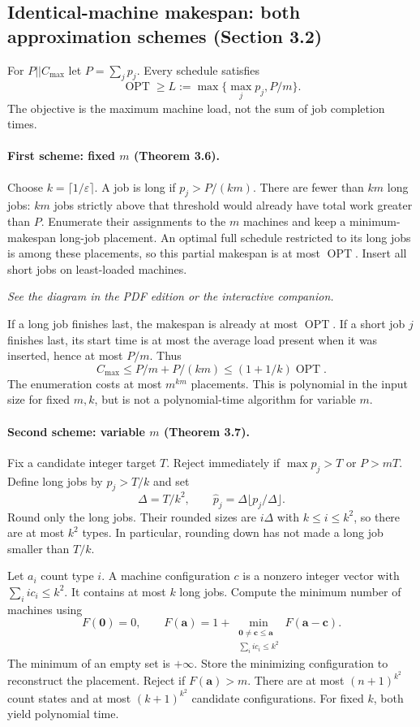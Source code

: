 \documentclass[11pt,a4paper]{article}
\newcommand{\OPT}{\operatorname{OPT}}
\newcommand{\1}{\mathbf 1}
\begin{document}
\subsection{Identical-machine makespan: both approximation schemes (Section 3.2)}
For $P||C_{\max}$ let $P=\sum_jp_j$. Every schedule satisfies
\[
 \OPT\geq L:=\max\{\max_jp_j,P/m\}.
\]
The objective is the maximum machine load, not the sum of job completion times.
\paragraph{First scheme: fixed $m$ (Theorem 3.6).}
Choose $k=\lceil1/\varepsilon\rceil$. A job is long if $p_j>P/(km)$.
There are fewer than $km$ long jobs: $km$ jobs strictly above that threshold
would already have total work greater than $P$. Enumerate their assignments
to the $m$ machines and keep a minimum-makespan long-job placement. An optimal
full schedule restricted to its long jobs is among these placements, so this
partial makespan is at most $\OPT$. Insert all short jobs on least-loaded machines.
\begin{center}\emph{See the diagram in the PDF edition or the interactive companion.}\end{center}
If a long job finishes last, the makespan is already at most $\OPT$.
If a short job $j$ finishes last, its start time is at most the average
load present when it was inserted, hence at most $P/m$. Thus
\[
 C_{\max}\leq P/m+P/(km)\leq(1+1/k)\OPT.
\]
The enumeration costs at most $m^{km}$ placements. This is polynomial in the
input size for fixed $m,k$, but is not a polynomial-time algorithm for variable $m$.

\paragraph{Second scheme: variable $m$ (Theorem 3.7).}
Fix a candidate integer target $T$. Reject immediately if $\max p_j>T$ or
$P>mT$. Define long jobs by $p_j>T/k$ and set
\[
 \Delta=T/k^2,\qquad \widehat p_j=\Delta\lfloor p_j/\Delta\rfloor.
\]
Round only the long jobs. Their rounded sizes are $i\Delta$ with
$k\leq i\leq k^2$, so there are at most $k^2$ types. In particular,
rounding down has not made a long job smaller than $T/k$.

Let $a_i$ count type $i$. A machine configuration $c$ is a nonzero integer vector
with $\sum_i i c_i\leq k^2$. It contains at most $k$ long jobs.
Compute the minimum number of machines using
\[
 F(\mathbf0)=0,\qquad
 F(\mathbf a)=1+\min_{\substack{\mathbf0\ne\mathbf c\leq\mathbf a\\
                              \sum_i i c_i\leq k^2}}F(\mathbf a-\mathbf c).
\]
The minimum of an empty set is $+\infty$. Store the minimizing configuration
to reconstruct the placement. Reject if $F(\mathbf a)>m$.
There are at most $(n+1)^{k^2}$ count states and at most
$(k+1)^{k^2}$ candidate configurations. For fixed $k$, both yield polynomial time.
\end{document}
